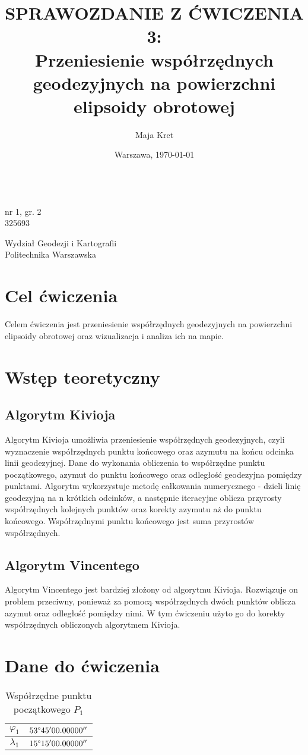 \documentclass[fleqn,10pt,a4paper]{article}
\title{\textbf{SPRAWOZDANIE Z ĆWICZENIA 3:}\\ Przeniesienie współrzędnych geodezyjnych na powierzchni elipsoidy obrotowej}
\author{Maja Kret}
\date{Warszawa, \today}
\makeatletter
\renewcommand{\maketitle}{%
  \begin{titlepage}
    \begin{center}
      \vspace*{2cm}
      {\huge \@title \par}
      \vspace{1.5cm}
      {\large \@author \\ nr 1, gr. 2 \\ 325693 \par}
      \vspace{1.5cm}
      {\large Wydział Geodezji i Kartografii\\ Politechnika Warszawska \par}
      \vspace{11cm}
      {\large \@date \par}
      \vspace{1.5cm}
    \end{center}
  \end{titlepage}
}
\makeatother
\begin{document}
 
\pagestyle{fancy}
\fancyhf{}
\rfoot{\thepage}
\renewcommand{\headrulewidth}{0pt}
\maketitle
\rhead{~}

\tableofcontents
\newpage

\section{Cel ćwiczenia}
Celem ćwiczenia jest przeniesienie współrzędnych geodezyjnych na powierzchni elipsoidy obrotowej
oraz wizualizacja i analiza ich na mapie.


\section{Wstęp teoretyczny}

\subsection{Algorytm Kivioja}
Algorytm Kivioja umożliwia przeniesienie współrzędnych geodezyjnych, czyli wyznaczenie współrzędnych punktu końcowego oraz azymutu na końcu odcinka linii geodezyjnej. 
Dane do wykonania obliczenia to współrzędne punktu początkowego, azymut do punktu końcowego oraz odległość geodezyjna pomiędzy punktami.
Algorytm wykorzystuje metodę całkowania numerycznego - dzieli linię geodezyjną na n krótkich odcinków, a następnie iteracyjne oblicza przyrosty współrzędnych kolejnych punktów oraz
korekty azymutu aż do punktu końcowego.
Współrzędnymi punktu końcowego jest suma przyrostów współrzędnych.

\subsection{Algorytm Vincentego}
Algorytm Vincentego jest bardziej złożony od algorytmu Kivioja. Rozwiązuje on problem przeciwny, ponieważ za pomocą współrzędnych dwóch punktów 
oblicza azymut oraz odległość pomiędzy nimi. W tym ćwiczeniu użyto go do korekty współrzędnych obliczonych algorytmem Kivioja.

\section{Dane do ćwiczenia}
\vspace*{1cm}

\begin{table}[!ht]
\centering
\begin{tabular}{|c|c|}
\hline
$\varphi_1$ & $53 \degree 45' 00.00000''$ \\ \hline
$\lambda_1$ & $15 \degree 15' 00.00000''$ \\ \hline
\end{tabular}
  \centering
  \caption{Współrzędne punktu początkowego $P_1$
\label{p1}}
\end{table}
\end{document}
